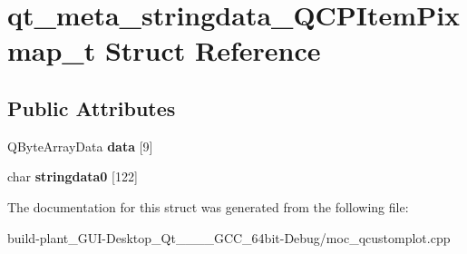 \hypertarget{structqt__meta__stringdata__QCPItemPixmap__t}{}\section{qt\+\_\+meta\+\_\+stringdata\+\_\+\+Q\+C\+P\+Item\+Pixmap\+\_\+t Struct Reference}
\label{structqt__meta__stringdata__QCPItemPixmap__t}
\subsection*{Public Attributes}
\begin{DoxyCompactItemize}
\item 
\mbox{\label{structqt__meta__stringdata__QCPItemPixmap__t_aef8aac1ad1d85c743f42d7ad8159bf41}} 
Q\+Byte\+Array\+Data {\bfseries data} \mbox{[}9\mbox{]}
\item 
\mbox{\label{structqt__meta__stringdata__QCPItemPixmap__t_aea88f01d1b77a98c2d9c3f2c64695c05}} 
char {\bfseries stringdata0} \mbox{[}122\mbox{]}
\end{DoxyCompactItemize}


The documentation for this struct was generated from the following file\+:\begin{DoxyCompactItemize}
\item 
build-\/plant\+\_\+\+G\+U\+I-\/\+Desktop\+\_\+\+Qt\+\_\+\_\+\_\+\_\+\+G\+C\+C\+\_\+64bit-\/\+Debug/moc\+\_\+qcustomplot.\+cpp\end{DoxyCompactItemize}
